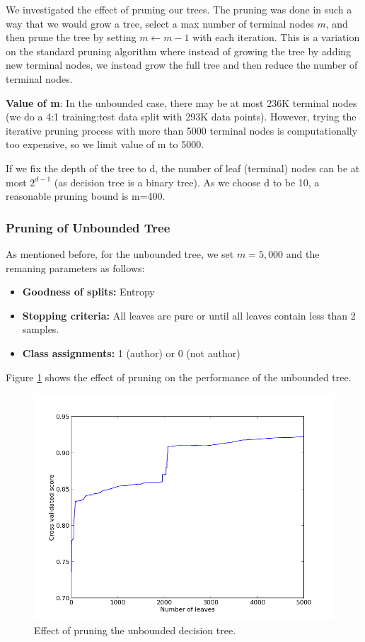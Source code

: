 \documentclass[letterpaper,12pt]{article}
\begin{document}
We investigated the effect of pruning our trees. The pruning was done in such a way that we would grow a tree, select a max number of terminal nodes $m$, and then prune the tree by setting $m \leftarrow m -1$ with each iteration. This is a variation on the standard pruning algorithm where instead of growing the tree by adding new terminal nodes, we instead grow the full tree and then reduce the number of terminal nodes.

\textbf{Value of m}: In the unbounded case, there may be at most 236K terminal nodes (we do a 4:1 training:test data split with 293K data points). However, trying the iterative pruning process with more than 5000 terminal nodes is computationally too expensive, so we limit value of m to 5000.    

If we fix the depth of the tree to d, the number of leaf (terminal) nodes can be at most $2^{d-1}$ (as decision tree is a binary tree). As we choose d to be 10, a reasonable pruning bound is m=400. 

\subsubsection{Pruning of Unbounded Tree}

As mentioned before, for the unbounded tree, we set $m=5,000$ and the remaning parameters as follows:

\begin{itemize}
\item\textbf{Goodness of splits:} Entropy
\item\textbf{Stopping criteria:} All leaves are pure or until all leaves contain less than 2 samples.
\item\textbf{Class assignments:} 1 (author) or 0 (not author)
\end{itemize}

Figure \ref{fig:prune_unlimited} shows the effect of pruning on the performance of the unbounded tree. 

\begin{figure}[ht!]
\includegraphics[width=\textwidth]{images/prune-unlimited.png}
\caption{Effect of pruning the unbounded decision tree.}\label{fig:prune_unlimited}
\end{figure}
\end{document}
